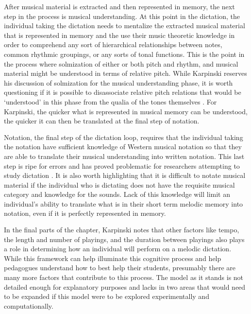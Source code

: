 \documentclass[]{book}
\begin{document}
After musical material is extracted and then represented in memory, the next step in the process is musical understanding.
At this point in the dictation, the individual taking the dictation needs to mentalize the extracted musical material that is represented in memory and the use their music theoretic knowledge in order to comprehend any sort of hierarchical relationships between notes, common rhythmic groupings, or any sorts of tonal functions.
This is the point in the process where solmization of either or both pitch and rhythm, and musical material might be understood in terms of relative pitch.
While Karpinski reserves his discussion of solmization for the musical understanding phase, it is worth questioning if it is possible to disassociate relative pitch relations that would be `understood' in this phase from the qualia of the tones themselves \citep{arthurPerceptualStudyScaledegree2018}.
For Karpinski, the quicker what is represented in musical memory can be understood, the quicker it can then be translated at the final step of notation.

Notation, the final step of the dictation loop, requires that the individual taking the notation have sufficient knowledge of Western musical notation so that they are able to translate their musical understanding into written notation.
This last step is ripe for errors and has proved problematic for researchers attempting to study dictation \citep{taylorStrategiesMemoryShort1983, klonoskiImprovingDictationAuralSkills2006}.
It is also worth highlighting that it is difficult to notate musical material if the individual who is dictating does not have the requisite musical category and knowledge for the sounds.
Lack of this knowledge will limit an individual's ability to translate what is in their short term melodic memory into notation, even if it is perfectly represented in memory.

In the final parts of the chapter, Karpinski notes that other factors like tempo, the length and number of playings, and the duration between playings also plays a role in determining how an individual will perform on a melodic dictation.
While this framework can help illuminate this cognitive process and help pedagogues understand how to best help their students, presumably there are many more factors that contribute to this process.
The model as it stands is not detailed enough for explanatory purposes and lacks in two areas that would need to be expanded if this model were to be explored experimentally and computationally.
\end{document}
